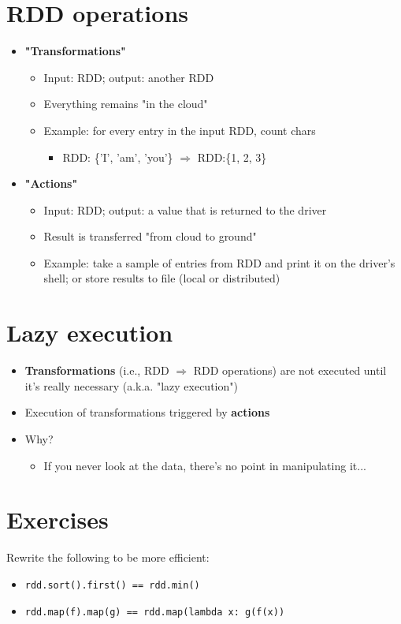 \documentclass[11pt]{article}
\begin{document}
\section*{RDD operations}
\begin{itemize}
	\item \textbf{"Transformations"}
		\begin{itemize}
			\item Input: RDD; output: another RDD
			\item Everything remains "in the cloud" 
			\item Example: for every entry in the input RDD, count chars 
				\begin{itemize}
					\item RDD: \{'I', 'am', 'you'\} $\Rightarrow$ RDD:\{1, 2, 3\}
				\end{itemize}
		\end{itemize}
	\item \textbf{"Actions"}
		\begin{itemize}
			\item Input: RDD; output: a value that is returned to the driver
			\item Result is transferred "from cloud to ground"
			\item Example: take a sample of entries from RDD and print it on the driver's shell; or store results to file (local or distributed) 
		\end{itemize}
\end{itemize}

\section*{Lazy execution}
\begin{itemize}
	\item \textbf{Transformations} (i.e., RDD $\Rightarrow$ RDD operations) are not executed until it's really necessary (a.k.a. "lazy execution")
	\item Execution of transformations triggered by \textbf{actions}
	\item Why?
		\begin{itemize}
			\item If you never look at the data, there's no point in manipulating it...
		\end{itemize}
\end{itemize}

\section*{Exercises}
Rewrite the following to be more efficient:
\begin{itemize}
	\item \verb|rdd.sort().first() == rdd.min()|
	\item \verb|rdd.map(f).map(g) == rdd.map(lambda x: g(f(x))|
\end{itemize}
\end{document}
